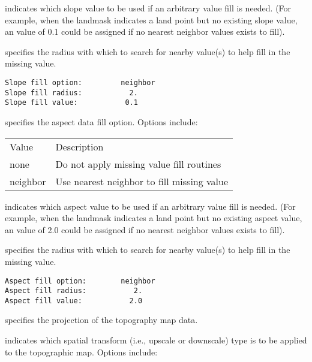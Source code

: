   indicates which slope
 value to be used if an arbitrary value fill is needed. 
 (For example, when the landmask indicates a land point but no existing 
 slope value, an value of 0.1 could be assigned if 
 no nearest neighbor values exists to fill).

  specifies the radius with which
 to search for nearby value(s) to help fill in the missing value.
 

 \begin{Verbatim}[frame=single]
Slope fill option:         neighbor
Slope fill radius:           2.
Slope fill value:           0.1
 \end{Verbatim}

 
  specifies the aspect
 data fill option.  Options include:

 \begin{tabular}{ll}
 Value    & Description                                \\
 none     & Do not apply missing value fill routines   \\
 neighbor & Use nearest neighbor to fill missing value \\
 \end{tabular}

  indicates which aspect
 value to be used if an arbitrary value fill is needed. 
 (For example, when the landmask indicates a land point but no existing 
 aspect value, an value of 2.0 could be assigned if 
 no nearest neighbor values exists to fill).

  specifies the radius with which
 to search for nearby value(s) to help fill in the missing value.
 

 \begin{Verbatim}[frame=single]
Aspect fill option:        neighbor
Aspect fill radius:           2.
Aspect fill value:           2.0
 \end{Verbatim}

 
  specifies the projection of the
 topography map data.

  indicates which spatial transform
 (i.e., upscale or downscale) type is to be applied to the topographic
 map.  Options include:

